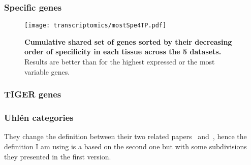\subsubsection{Specific genes}

\begin{figure}[htpb]
    \texttt{[image: transcriptomics/mostSpe4TP.pdf]}\centering
    \caption[Cumulative shared set of genes sorted by their specificity in each
    tissue across the 5 datasets]{\label{fig:mostSpe4T}\textbf{Cumulative shared
    set of genes sorted by their decreasing order of specificity in each tissue
    across the 5 datasets.} Results are better than for the highest expressed or
    the most variable genes.}
\end{figure}

\subsubsection{TIGER genes}

\subsubsection{Uhlén categories}

They change the definition between their two related papers~
and~, hence the definition I am using is a based on the second
one but with some subdivisions they presented in the first version.

